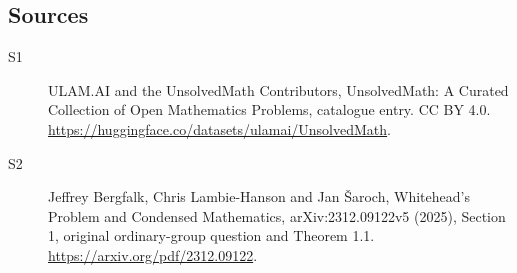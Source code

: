\documentclass[11pt]{article}
\begin{document}
\subsection{Sources}
\begin{description}
\item[\hypertarget{source:statement:1}{S1}] ULAM.AI and the UnsolvedMath Contributors, UnsolvedMath: A Curated Collection of Open Mathematics Problems, catalogue entry. CC BY 4.0. \url{https://huggingface.co/datasets/ulamai/UnsolvedMath}.
\item[\hypertarget{source:statement:2}{S2}] Jeffrey Bergfalk, Chris Lambie-Hanson and Jan Šaroch, Whitehead’s Problem and Condensed Mathematics, arXiv:2312.09122v5 (2025), Section 1, original ordinary-group question and Theorem 1.1. \url{https://arxiv.org/pdf/2312.09122}.
\end{description}
\label{end:statement}
\end{document}

